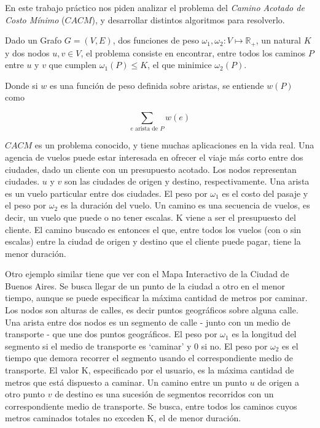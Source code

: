 
En este trabajo pr\'actico nos piden analizar el problema del \textit{Camino Acotado de Costo M\'inimo} ($CACM$), y desarrollar distintos algoritmos para resolverlo. 

Dado un Grafo $G = (V,E)$, dos funciones de peso $\omega_1, \omega_2: V \mapsto \mathbb{R}_+$, un natural $K$ y dos nodos $u,v \in V$, el problema consiste en encontrar, entre todos los caminos $P$ entre $u$ y $v$ que cumplen $\omega_1(P) \leq K$, el que minimice $\omega_2(P)$. 

Donde si $w$ es una función de peso definida sobre aristas, se entiende $w(P)$ como 

\begin{equation*}
\sum_{e \text{ arista de } P} w(e)
\end{equation*}

$CACM$ es un problema conocido, y tiene muchas aplicaciones en la vida real. Una agencia de vuelos puede estar interesada en ofrecer el viaje más corto entre dos ciudades, dado un cliente con un presupuesto acotado. Los nodos representan ciudades. $u$ y $v$ son las ciudades de origen y destino, respectivamente. Una arista es un vuelo particular entre dos ciudades. El peso por $\omega_1$ es el costo del pasaje y el peso por $\omega_2$  es la duración del vuelo. Un camino es una secuencia de vuelos, es decir, un vuelo que puede o no tener escalas. K viene a ser el presupuesto del cliente. El camino buscado es entonces el que, entre todos los vuelos (con o sin escalas) entre la ciudad de origen y destino que el cliente puede pagar, tiene la menor duración.

Otro ejemplo similar tiene que ver con el Mapa Interactivo de la Ciudad de Buenos Aires. Se busca llegar de un punto de la ciudad a otro en el
menor tiempo, aunque se puede especificar la máxima cantidad de metros por caminar. Los nodos son alturas de calles, es decir puntos geográficos sobre alguna calle. Una arista entre dos nodos es un segmento de calle - junto con un medio de transporte - que une dos puntos geográficos. El peso por $\omega_1$ es la longitud del segmento si el medio de transporte es `caminar' y 0 si no. El peso por $\omega_2$ es el tiempo que demora recorrer el segmento usando el correspondiente medio de transporte. El valor K, especificado por el usuario, es la máxima cantidad de metros que está dispuesto a caminar. Un camino entre un punto $u$ de origen a otro punto $v$ de destino es una sucesión de segmentos recorridos con un correspondiente medio de transporte. Se busca, entre todos los caminos cuyos metros caminados totales no exceden K, el de menor duración.

